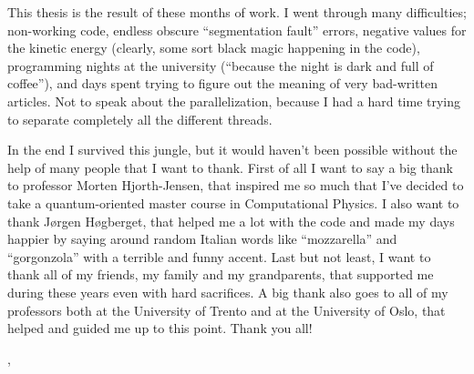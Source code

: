 This thesis is the result of these months of work. I went through many difficulties; non-working code, endless obscure ``segmentation fault'' errors, negative values for the kinetic energy (clearly, some sort black magic happening in the code), programming nights at the university (``because the night is dark and full of coffee''), and days spent trying to figure out the meaning of very bad-written articles. Not to speak about the parallelization, because I had a hard time trying to separate completely all the different threads.

In the end I survived this jungle, but it would haven't been possible without the help of many people that I want to thank. First of all I want to say a big thank to professor Morten Hjorth-Jensen, that inspired me so much that I've decided to take a quantum-oriented master course in Computational Physics. I also want to thank Jørgen Høgberget, that helped me a lot with the code and made my days happier by saying around random Italian words like ``mozzarella'' and ``gorgonzola'' with a terrible and funny accent. Last but not least, I want to thank all of my friends, my family and my grandparents, that supported me during these years even with hard sacrifices. A big thank also goes to all of my professors both at the University of Trento and at the University of Oslo, that helped and guided me up to this point. Thank you all!

\begin{flushright}
	{ \THauthor }
\end{flushright}
\begin{flushleft}
	{ \THplace, \THdate }
\end{flushleft}


